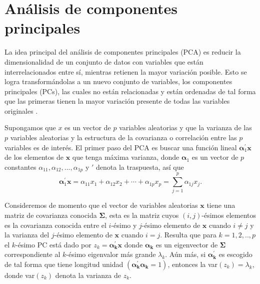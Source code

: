 \section{Análisis de componentes principales}

La idea principal del análisis de componentes principales (PCA) es reducir la dimensionalidad de un conjunto de datos con variables que están interrelacionados entre sí, mientras retienen la mayor variación posible. Esto se logra transformándolas a un nuevo conjunto de variables, los componentes principales (PCs), las cuales no están relacionadas y están ordenadas de tal forma que las primeras tienen la mayor variación presente de todas las variables originales \parencite{jolliffePrincipalComponentAnalysis2002}.

Supongamos que $x$ es un vector de $p$ variables aleatorias y que la varianza de las $p$ variables aleatorias y la estructura de la covarianza o correlación entre las $p$ variables es de interés. El primer paso del PCA es buscar una función lineal $\boldsymbol{\alpha}_1^\prime \boldsymbol{x}$ de los elementos de $\boldsymbol{x}$ que tenga máxima varianza, donde $\boldsymbol{\alpha}_{1}$ es un vector de $p$ constantes $\alpha_{11},\alpha_{12},...,\alpha_{1p}$ y $\prime$ denota la traspuesta, así que
\[
\boldsymbol{\alpha}_{1}^{\prime} \boldsymbol{x}=\alpha_{11} x_{1}+\alpha_{12} x_{2}+\cdots+\alpha_{1 p} x_{p}=\sum_{j=1}^{p} \alpha_{1 j} x_{j}.
\] 

Consideremos de momento que el vector de variables aleatorias $\boldsymbol{x}$ tiene una matriz de covarianza conocida $\boldsymbol{\Sigma}$, esta es la matriz cuyos $(i,j)$-ésimos elementos es la covarianza conocida entre el $i$-ésimo y $j$-ésimo elemento de $\boldsymbol{x}$ cuando $i \neq j$ y la varianza del $j$-ésimo elemento de $\boldsymbol{x}$ cuando $i = j$. Resulta que para $k=1,2,..,p$ el $k$-ésimo PC está dado por $z_k = \boldsymbol{\alpha_k^\prime} \boldsymbol{x}$ donde $\boldsymbol{\alpha_k}$ es un eigenvector de $\boldsymbol{\Sigma}$ correspondiente al $k$-ésimo eigenvalor más grande $\lambda_k$. Aún más, si $\boldsymbol{\alpha_k^\prime}$ es escogido de tal forma que tiene longitud unidad $(\boldsymbol{\alpha_k^\prime}\boldsymbol{\alpha_k}=1)$, entonces la var$(z_k)=\lambda_k$, donde var$(z_k)$ denota la varianza de $z_k$.


